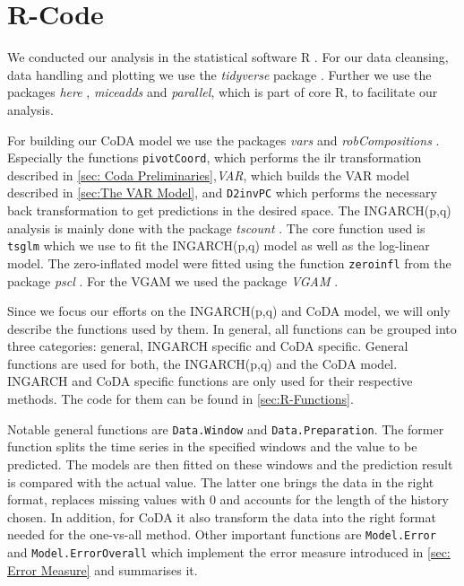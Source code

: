 \section{R-Code}
\label{sec:R-Code}

We conducted our analysis in the statistical software R \cite{R:2022}. For our data cleansing, data handling and plotting we use the \textit{tidyverse} package \cite{Tidyverse:2019}. Further we use the packages \textit{here} \cite{here:2020}, \textit{miceadds} \cite{Miceadds:2023} and \textit{parallel}, which is part of core R, to facilitate our analysis.  

For building our CoDA model we use the packages \textit{vars} \cite{VAR:2008,CoDAR2:2008} and \textit{robCompositions} \cite{RobComp:2011,CoDAR4:2018}. Especially the functions \texttt{pivotCoord}, which performs the ilr transformation described in \ref{sec: Coda Preliminaries},\textit{VAR}, which builds the VAR model described in \ref{sec:The VAR Model}, and \texttt{D2invPC} which performs the necessary back transformation to get predictions in the desired space. The INGARCH(p,q) analysis is mainly done with the package \textit{tscount} \cite{Tscount:2017,Tscount:2020}. The core function used is \texttt{tsglm} which we use to fit the INGARCH(p,q) model as well as the log-linear model. The zero-inflated model were fitted using the function \texttt{zeroinfl} from the package \textit{pscl} \cite{Pscl:2008}. For the VGAM we used the package \textit{VGAM} \cite{RVGAM:2010}. 

Since we focus our efforts on the INGARCH(p,q) and CoDA model, we will only describe the functions used by them. In general, all functions can be grouped into three categories: general, INGARCH specific and CoDA specific. General functions are used for both, the INGARCH(p,q) and the CoDA model. INGARCH and CoDA specific functions are only used for their respective methods. The code for them can be found in \ref{sec:R-Functions}. 

Notable general functions are \texttt{Data.Window} and \texttt{Data.Preparation}. The former function splits the time series in the specified windows and the value to be predicted. The models are then fitted on these windows and the prediction result is compared with the actual value. The latter one brings the data in the right format, replaces missing values with 0 and accounts for the length of the history chosen. In addition, for CoDA it also transform the data into the right format needed for the one-vs-all method. Other important functions are \texttt{Model.Error} and \texttt{Model.ErrorOverall} which implement the error measure introduced in \ref{sec: Error Measure} and summarises it. 

